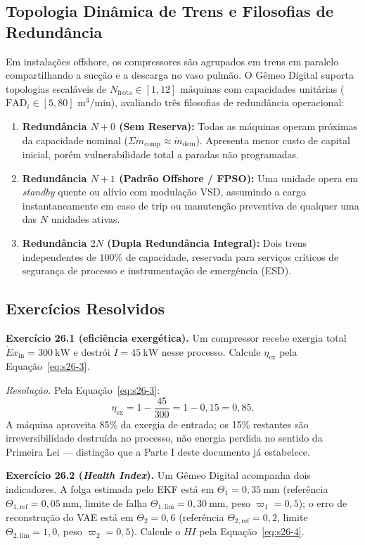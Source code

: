 \documentclass[12pt,a4paper]{article}
\numberwithin{equation}{section}
\numberwithin{table}{section}
\numberwithin{figure}{section}
\begin{document}
	\subsection{Topologia Dinâmica de Trens e Filosofias de Redundância}
	Em instalações offshore, os compressores são agrupados em trens em paralelo compartilhando a sucção e a descarga no vaso pulmão. O Gêmeo Digital suporta topologias escaláveis de $N_{\text{frota}} \in [1, 12]$ máquinas com capacidades unitárias ($\text{FAD}_i \in [5, 80]\text{ m}^3/\text{min}$), avaliando três filosofias de redundância operacional:
	\begin{enumerate}
		\item \textbf{Redundância $N+0$ (Sem Reserva):} Todas as máquinas operam próximas da capacidade nominal ($\Sigma \dot{m}_{\text{comp}} \approx \dot{m}_{\text{dem}}$). Apresenta menor custo de capital inicial, porém vulnerabilidade total a paradas não programadas.
		\item \textbf{Redundância $N+1$ (Padrão Offshore / FPSO):} Uma unidade opera em \textit{standby} quente ou alívio com modulação VSD, assumindo a carga instantaneamente em caso de trip ou manutenção preventiva de qualquer uma das $N$ unidades ativas.
		\item \textbf{Redundância $2N$ (Dupla Redundância Integral):} Dois trens independentes de $100\%$ de capacidade, reservada para serviços críticos de segurança de processo e instrumentação de emergência (ESD).
	\end{enumerate}

	\subsection{Exercícios Resolvidos}

	\textbf{Exercício 26.1 (eficiência exergética).} Um compressor recebe
	exergia total $\dot{E}x_{\text{in}} = 300\ \mathrm{kW}$ e destrói
	$\dot{I} = 45\ \mathrm{kW}$ nesse processo. Calcule $\eta_{\text{ex}}$
	pela Equação~\eqref{eq:s26-3}.

	\emph{Resolução.} Pela Equação~\eqref{eq:s26-3}:
	$$\eta_{\text{ex}} = 1 - \frac{45}{300} = 1 - 0{,}15 = 0{,}85.$$
	A máquina aproveita 85\% da exergia de entrada; os 15\% restantes são
	irreversibilidade destruída no processo, não energia perdida no
	sentido da Primeira Lei --- distinção que a Parte I deste documento já
	estabelece.

	\textbf{Exercício 26.2 (\textit{Health Index}).} Um Gêmeo Digital
	acompanha dois indicadores. A folga estimada pelo EKF está em
	$\Theta_1 = 0{,}35\ \mathrm{mm}$ (referência
	$\Theta_{1,\text{ref}}=0{,}05\ \mathrm{mm}$, limite de falha
	$\Theta_{1,\text{lim}}=0{,}30\ \mathrm{mm}$, peso $\varpi_1=0{,}5$); o
	erro de reconstrução do VAE está em $\Theta_2 = 0{,}6$ (referência
	$\Theta_{2,\text{ref}}=0{,}2$, limite $\Theta_{2,\text{lim}}=1{,}0$,
	peso $\varpi_2=0{,}5$). Calcule o $HI$ pela Equação~\eqref{eq:s26-4}.
\end{document}
